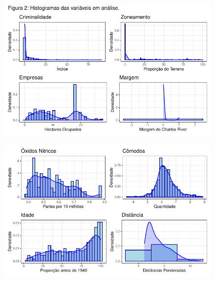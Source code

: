 \documentclass[
  letterpaper,
]{report}
\begin{document}
\begin{figure}[H]

{\centering \includegraphics{Parte-1_files/figure-pdf/unnamed-chunk-3-1.pdf}

}

\end{figure}

\begin{figure}[H]

{\centering \includegraphics{Parte-1_files/figure-pdf/unnamed-chunk-3-2.pdf}

}

\end{figure}
\end{document}
